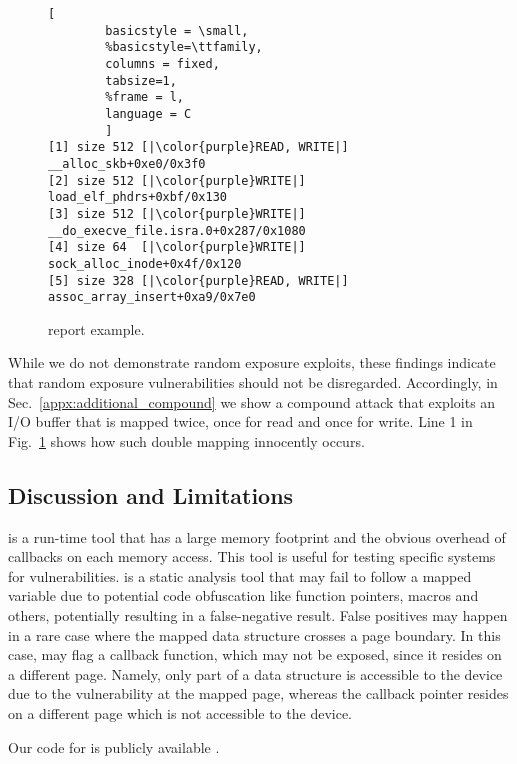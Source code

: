 %
\begin{figure}[t]
\begin{adjustbox}{width=0.9\linewidth}
        \begin{lstlisting}[
        basicstyle = \small,
        %basicstyle=\ttfamily,
        columns = fixed,
        tabsize=1,
        %frame = l,
        language = C
        ]
[1] size 512 [|\color{purple}READ, WRITE|] __alloc_skb+0xe0/0x3f0
[2] size 512 [|\color{purple}WRITE|] load_elf_phdrs+0xbf/0x130
[3] size 512 [|\color{purple}WRITE|] __do_execve_file.isra.0+0x287/0x1080
[4] size 64  [|\color{purple}WRITE|] sock_alloc_inode+0x4f/0x120
[5] size 328 [|\color{purple}READ, WRITE|] assoc_array_insert+0xa9/0x7e0
        \end{lstlisting}
\end{adjustbox}
        \caption{\dkasan report example.}
        \label{fig:dkasan-report}
\end{figure}

While we do not demonstrate random exposure exploits, these findings indicate that random exposure vulnerabilities should not be disregarded. Accordingly, in Sec.~\ref{appx:additional_compound} we show a compound attack that exploits an I/O buffer that is mapped twice, once for read and once for write. Line 1 in Fig.~\ref{fig:dkasan-report}  shows how such double mapping innocently occurs.

\subsection{Discussion and Limitations}
\dkasan is a run-time tool that has a large memory footprint and the obvious overhead of callbacks on each memory access. This tool is useful for testing specific systems for vulnerabilities.
\tool is a static analysis tool that may fail to follow a mapped variable due to potential code obfuscation like function pointers, macros and others, potentially resulting in a false-negative result. False positives may happen in a rare case
where the mapped data structure crosses a  page boundary. In this case, \tool may flag a callback function, which may not be exposed, since it resides on a different page. Namely, only part of a data structure is accessible to the device due to the \subpage{} vulnerability at the mapped page, whereas the callback pointer resides on a different page which is not accessible to the device.%

Our code for \dkasan is publicly available \cite{DKASAN}.